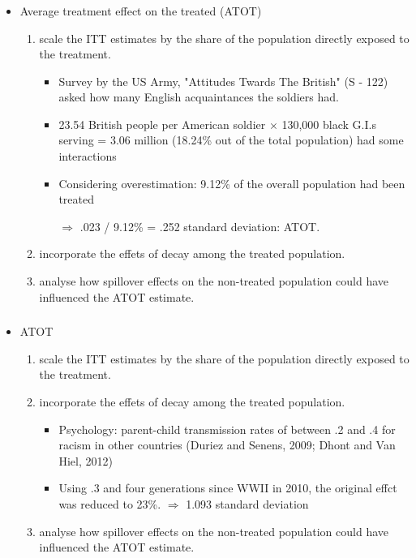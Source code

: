 \documentclass[dvipdfmx,11pt]{beamer}
\begin{document}
\begin{frame}\frametitle{}
  \begin{itemize}
    \item Average treatment effect on the treated (ATOT)
    \begin{enumerate}
      \item scale the ITT estimates by the share of the population directly exposed to the treatment.
      \begin{itemize}
        \item Survey by the US Army, "Attitudes Twards The British" (S - 122) asked how many English acquaintances the soldiers had.
        \item 23.54 British people per American soldier $\times$ 130,000 black G.I.s serving = 3.06 million (18.24\% out of the total population) had some interactions
        \item Considering overestimation: 9.12\% of the overall population had been treated

        $\Rightarrow$ .023 / 9.12\% = .252 standard deviation: ATOT.
      \end{itemize}
      \item incorporate the effets of decay among the treated population.
      \item analyse how spillover effects on the non-treated population could have influenced the ATOT estimate.
    \end{enumerate}
  \end{itemize}
\end{frame}

\begin{frame}\frametitle{}
  \begin{itemize}
    \item ATOT
    \begin{enumerate}
      \item scale the ITT estimates by the share of the population directly exposed to the treatment.

      \item incorporate the effets of decay among the treated population.
      \begin{itemize}
        \item Psychology: parent-child transmission rates of between .2 and .4 for racism in other countries (Duriez and Senens, 2009; Dhont and Van Hiel, 2012)
        \item Using .3 and four generations since WWII in 2010, the original effct was reduced to 23\%.
        $\Rightarrow$ 1.093 standard deviation
      \end{itemize}
      \item analyse how spillover effects on the non-treated population could have influenced the ATOT estimate.
    \end{enumerate}
  \end{itemize}
\end{frame}
\end{document}
